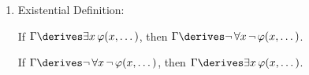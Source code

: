 \begin{enumerate}[topsep=2pt,itemsep=10pt,label=\textup{\texttt{(\arabic*)}}]
        If \( \Gamma \derives \exists x \, \varphi(x, \dots) \) and \( t \) does not appear in \( \varphi(x, \dots) \),
        then \( \Gamma \derives \varphi(t \mapsto x, \dots) \).

    \item Existential Definition:  \label{rule-of-inference:existential-definition}

        If \( \Gamma \derives \exists x \, \varphi(x, \dots) \), then \( \Gamma \derives \lnot \, \forall x \, \lnot \, \varphi(x, \dots) \).

        \noindent
        If \( \Gamma \derives \lnot \, \forall x \, \lnot \, \varphi(x, \dots) \), then \( \Gamma \derives \exists x \, \varphi(x, \dots) \).
\end{enumerate}
